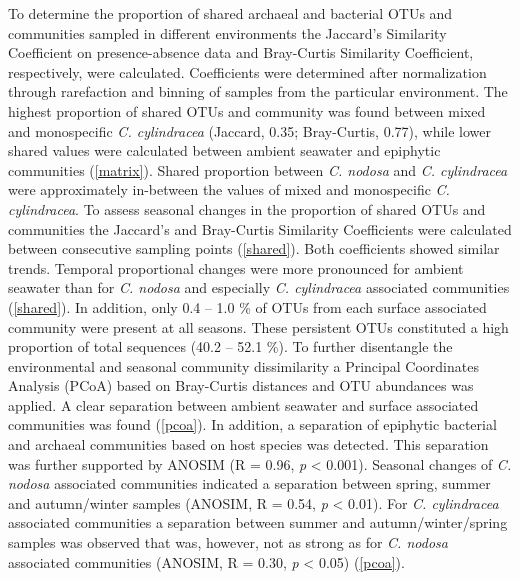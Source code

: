 \documentclass[12pt,]{article}
\begin{document}
To determine the proportion of shared archaeal and bacterial OTUs and
communities sampled in different environments the Jaccard's Similarity
Coefficient on presence-absence data and Bray-Curtis Similarity
Coefficient, respectively, were calculated. Coefficients were determined
after normalization through rarefaction and binning of samples from the
particular environment. The highest proportion of shared OTUs and
community was found between mixed and monospecific \emph{C. cylindracea}
(Jaccard, 0.35; Bray-Curtis, 0.77), while lower shared values were
calculated between ambient seawater and epiphytic communities
(\autoref{matrix}). Shared proportion between \emph{C. nodosa} and
\emph{C. cylindracea} were approximately in-between the values of mixed
and monospecific \emph{C. cylindracea}. To assess seasonal changes in
the proportion of shared OTUs and communities the Jaccard's and
Bray-Curtis Similarity Coefficients were calculated between consecutive
sampling points (\autoref{shared}). Both coefficients showed similar
trends. Temporal proportional changes were more pronounced for ambient
seawater than for \emph{C. nodosa} and especially \emph{C. cylindracea}
associated communities (\autoref{shared}). In addition, only 0.4 -- 1.0
\si{\percent} of OTUs from each surface associated community were
present at all seasons. These persistent OTUs constituted a high
proportion of total sequences (40.2 -- 52.1 \si{\percent}). To further
disentangle the environmental and seasonal community dissimilarity a
Principal Coordinates Analysis (PCoA) based on Bray-Curtis distances and
OTU abundances was applied. A clear separation between ambient seawater
and surface associated communities was found (\autoref{pcoa}). In
addition, a separation of epiphytic bacterial and archaeal communities
based on host species was detected. This separation was further
supported by ANOSIM (R = 0.96, \emph{p} \textless{} 0.001). Seasonal
changes of \emph{C. nodosa} associated communities indicated a
separation between spring, summer and autumn/winter samples (ANOSIM, R =
0.54, \emph{p} \textless{} 0.01). For \emph{C. cylindracea} associated
communities a separation between summer and autumn/winter/spring samples
was observed that was, however, not as strong as for \emph{C. nodosa}
associated communities (ANOSIM, R = 0.30, \emph{p} \textless{} 0.05)
(\autoref{pcoa}).
\end{document}
